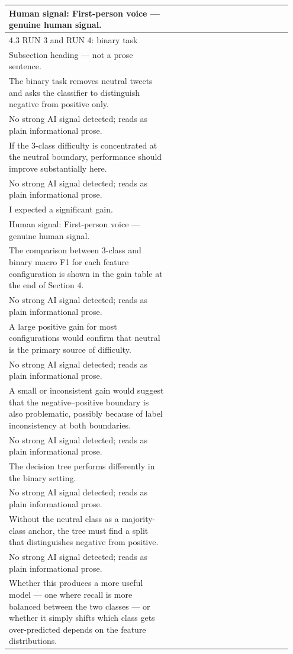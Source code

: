 \documentclass[11pt]{article}
\begin{document}
\begin{longtable}{|p{0.55\linewidth}|p{0.40\linewidth}|}
Human signal: First-person voice --- genuine human signal. & \\
\hline
4.3 RUN 3 and RUN 4: binary task & \\[2pt]
\hline
Subsection heading --- not a prose sentence. & \\
\hline
The binary task removes neutral tweets and asks the classifier to distinguish negative from positive only. & \\[2pt]
\hline
No strong AI signal detected; reads as plain informational prose. & \\
\hline
If the 3-class difficulty is concentrated at the neutral boundary, performance should improve substantially here. & \\[2pt]
\hline
No strong AI signal detected; reads as plain informational prose. & \\
\hline
I expected a significant gain. & \\[2pt]
\hline
Human signal: First-person voice --- genuine human signal. & \\
\hline
The comparison between 3-class and binary macro F1 for each feature configuration is shown in the gain table at the end of Section 4. & \\[2pt]
\hline
No strong AI signal detected; reads as plain informational prose. & \\
\hline
A large positive gain for most configurations would confirm that neutral is the primary source of difficulty. & \\[2pt]
\hline
No strong AI signal detected; reads as plain informational prose. & \\
\hline
A small or inconsistent gain would suggest that the negative--positive boundary is also problematic, possibly because of label inconsistency at both boundaries. & \\[2pt]
\hline
No strong AI signal detected; reads as plain informational prose. & \\
\hline
The decision tree performs differently in the binary setting. & \\[2pt]
\hline
No strong AI signal detected; reads as plain informational prose. & \\
\hline
Without the neutral class as a majority-class anchor, the tree must find a split that distinguishes negative from positive. & \\[2pt]
\hline
No strong AI signal detected; reads as plain informational prose. & \\
\hline
Whether this produces a more useful model --- one where recall is more balanced between the two classes --- or whether it simply shifts which class gets over-predicted depends on the feature distributions. & \\[2pt]

\end{longtable}
\end{document}
